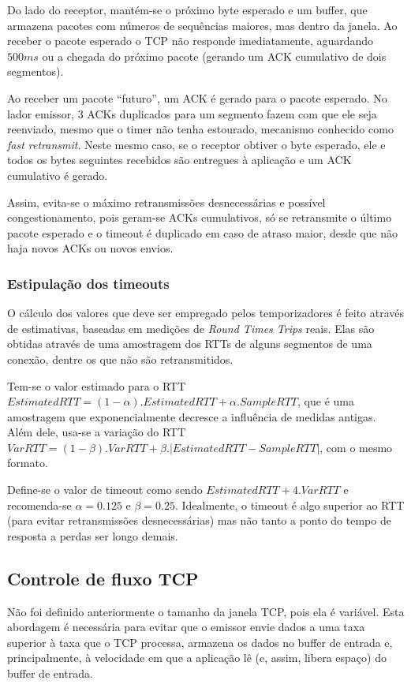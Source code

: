 Do lado do receptor, mantém-se o próximo byte esperado e um buffer, que armazena pacotes com números de sequências maiores, mas dentro da janela.
Ao receber o pacote esperado o TCP não responde imediatamente, aguardando $500ms$ ou a chegada do próximo pacote (gerando um ACK cumulativo de dois segmentos).

Ao receber um pacote ``futuro'', um ACK é gerado para o pacote esperado.
No lador emissor, 3 ACKs duplicados para um segmento fazem com que ele seja reenviado, mesmo que o timer não tenha estourado, mecanismo conhecido como \emph{fast retransmit}.
Neste mesmo caso, se o receptor obtiver o byte esperado, ele e todos os bytes seguintes recebidos são entregues à aplicação e um ACK cumulativo é gerado.

Assim, evita-se o máximo retransmissões desnecessárias e possível congestionamento, pois geram-se ACKs cumulativos, só se retransmite o último pacote esperado e o timeout é duplicado em caso de atraso maior, desde que não haja novos ACKs ou novos envios.

\subsubsection{Estipulação dos timeouts}

O cálculo dos valores que deve ser empregado pelos temporizadores é feito através de estimativas, baseadas em medições de \emph{Round Times Trips} reais.
Elas são obtidas através de uma amostragem dos RTTs de alguns segmentos de uma conexão, dentre os que não são retransmitidos.

Tem-se o valor estimado para o RTT $EstimatedRTT = (1 - \alpha) . EstimatedRTT + \alpha . SampleRTT$, que é uma amostragem que exponencialmente decresce a influência de medidas antigas.
Além dele, usa-se a variação do RTT $VarRTT = (1 - \beta) . VarRTT + \beta . | EstimatedRTT - SampleRTT|$, com o mesmo formato.

Define-se o valor de timeout como sendo $EstimatedRTT + 4 . VarRTT$ e recomenda-se $\alpha = 0.125$ e $\beta = 0.25$.
Idealmente, o timeout é algo superior ao RTT (para evitar retransmissões desnecessárias) mas não tanto a ponto do tempo de resposta a perdas ser longo demais.


\subsection{Controle de fluxo TCP}

Não foi definido anteriormente o tamanho da janela TCP, pois ela é variável.
Esta abordagem é necessária para evitar que o emissor envie dados a uma taxa superior à taxa que o TCP processa, armazena os dados no buffer de entrada e, principalmente, à velocidade em que a aplicação lê (e, assim, libera espaço) do buffer de entrada.

